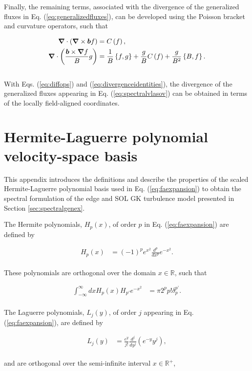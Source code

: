 \documentclass[preprint,12pt]{elsarticle}
\renewcommand{\pb}[2]{\left\{ #1, #2\right\}}
\newcommand{\curv}[1]{C\left( #1\right)}
\begin{document}
Finally, the remaining terms, associated with the divergence of the generalized fluxes in Eq. (\ref{eq:generalizedfluxes}), can be developed using the Poisson bracket and curvature operators, such that

\begin{subequations} \label{eq:divergenceidentities}
  \begin{align}
    \grad \cdot \left( \grad \times \bm b f \right)& = \curv{f} , \\
    \grad \cdot \left( \frac{\bm b \times \grad f }{B} g \right)  & =\frac{1}{B} \pb{f}{g} + \frac{g}{B} \curv{f} + \frac{g}{B^2} \pb{B}{f}.
    \end{align}
\end{subequations}
\\
With Eqs. (\ref{eq:diffops}) and (\ref{eq:divergenceidentities}), the divergence of the generalized fluxes appearing in Eq. (\ref{eq:spectralvlasov}) can be obtained in terms of the locally field-aligned coordinates.

\section{Hermite-Laguerre polynomial velocity-space basis}
\label{appendix:properties}

This appendix introduces the definitions and describe the properties of the scaled Hermite-Laguerre polynomial basis used in Eq. (\ref{eq:faexpansion}) to obtain the spectral formulation of the edge and SOL GK turbulence model presented in Section \ref{sec:spectralgenex}.

The Hermite polynomials, $H_p(x)$, of order $p$ in Eq. (\ref{eq:faexpansion}) are defined by \cite{gradshteyn2014}

\begin{align}
H_p(x) & = (-1)^p e^{x^2} \frac{d^p}{dx^p} e^{- x^2}.
\end{align}
\\
These polynomials are orthogonal over the domain $x \in \mathbb{R}$, such that 

\begin{align} \label{eq:orthohermite}
\int_{- \infty}^\infty dx H_p(x) H_{p'} e^{- x^2}& = \pi 2^p p!  \delta_p^{p’}.
\end{align}
\\
The Laguerre polynomials, $L_j(y)$, of order $j$ appearing in Eq. (\ref{eq:faexpansion}), are defined by \cite{gradshteyn2014}

\begin{align}
L_j(y) & = \frac{e^y}{j!} \frac{d^j}{dy^j} \left( e^{- y} y^j \right),
\end{align}
\\
and are orthogonal over the semi-infinite interval $x \in \mathbb{R}^+$,
\end{document}
